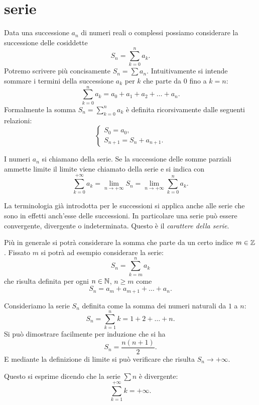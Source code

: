 \chapter{serie}

Data una successione $a_n$ di numeri reali o complessi
possiamo considerare la successione
delle cosiddette 
\[
  S_n = \sum_{k=0}^{n} a_k.
\]
Potremo scrivere più concisamente $S_n = \sum a_n$.
Intuitivamente si intende sommare i termini della successione $a_k$
per $k$ che parte da $0$ fino a $k=n$:
\[
  \sum_{k=0}^n a_k = a_0 + a_1 + a_2 + \dots + a_n.
\]
Formalmente la somma $S_n=\displaystyle \sum_{k=0}^n a_k$
è definita ricorsivamente
dalle seguenti relazioni:
\[
  \begin{cases}
    S_0 = a_0, \\
    S_{n+1} = S_n + a_{n+1}.
  \end{cases}
\]

I numeri $a_n$ si chiamano  della serie.
%
Se la successione delle somme parziali ammette limite il limite viene chiamato
%
della serie e si indica con
\[
  \sum_{k=0}^{+\infty} a_k = \lim_{n\to +\infty} S_n = \lim_{n\to+\infty} \sum_{k=0}^n a_k.
\]

La terminologia già introdotta per le successioni si applica anche alle
serie che sono in effetti anch'esse delle successioni.
In particolare una serie può essere convergente, divergente o indeterminata.
Questo è il \emph{carattere della serie}.
%
%
%

Più in generale si potrà considerare la somma che parte da un certo
indice $m\in {\mathbb Z}$.
Fissato $m$ si potrà ad esempio considerare la serie:
\[
  S_n = \sum_{k=m}^n a_k
\]
che risulta definita per ogni $n\in{\mathbb N}$, $n\ge m$
come
\[
  S_n = a_m + a_{m+1} + \dots + a_n.
\]

\begin{example}
Consideriamo la serie $S_n$ definita
come la somma dei numeri naturali da $1$ a $n$:
\[
  S_n = \sum_{k=1}^n k = 1 + 2 + \dots + n.
\]
Si può dimostrare facilmente per induzione che si ha
\[
  S_n = \frac{n(n+1)}{2}.
\]
E mediante la definizione di limite si può verificare che
risulta $S_n \to +\infty$.

Questo si esprime dicendo che la serie $\sum n$ è divergente:
\[
     \sum_{k=1}^{+\infty} k = +\infty.
\]
\end{example}

